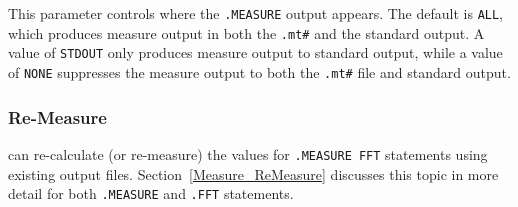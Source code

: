 \begin{Command}
\begin{Arguments}

This parameter controls where the {\tt .MEASURE} output appears.  The
default is {\tt ALL}, which produces measure output in both the
\texttt{.mt\#} and the standard output.  A value of {\tt STDOUT}
only produces measure output to standard output, while a value of
{\tt NONE} suppresses the measure output to both the \texttt{.mt\#}
file and standard output.

\end{Arguments}

\end {Command}

\subsubsection{Re-Measure}
\label{Measure_FFT_ReMeasure}
\Xyce{} can re-calculate (or re-measure) the values for {\tt .MEASURE FFT}
statements using existing \Xyce{} output files.  Section~\ref{Measure_ReMeasure}
discusses this topic in more detail for both {\tt .MEASURE} and {\tt .FFT}
statements.



